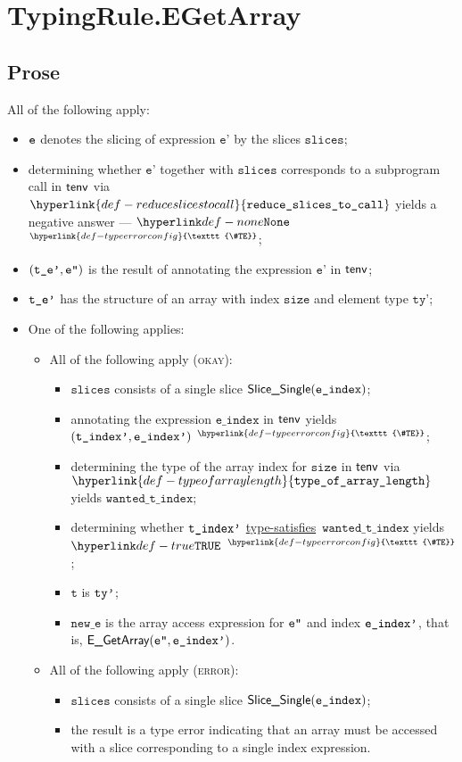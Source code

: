 \documentclass{book}
\newcommand\TypeErrorConfig[0]{\hyperlink{def-typeerrorconfig}{\texttt{\#TE}}}
\newcommand\ProseOrTypeError[0]{\hyperlink{def-proseortypeerror}{$^{\TypeErrorConfig}$}}
\newcommand\typesatisfies[0]{\hyperlink{def-typesatisfies}{type-satisfies}}
\newcommand\reduceslicestocall[0]{\hyperlink{def-reduceslicestocall}{\texttt{reduce\_slices\_to\_call}}}
\newcommand\typeofarraylength[0]{\hyperlink{def-typeofarraylength}{\texttt{type\_of\_array\_length}}}
\newcommand\vt[0]{\texttt{t}}
\newcommand\size[0]{\texttt{size}}
\newcommand\tty[0]{\texttt{ty}}
\newcommand\eindex[0]{\texttt{e\_index}}
\newcommand\wantedtindex[0]{\texttt{wanted\_t\_index}}
\newcommand\slices[0]{\texttt{slices}}
\newcommand\newe[0]{\texttt{new\_e}}
\newcommand\vep[0]{\texttt{e'}}
\begin{document}
\section{TypingRule.EGetArray \label{sec:TypingRule.EGetArray}}

\subsection{Prose}
All of the following apply:
\begin{itemize}
  \item $\texttt{e}$ denotes the slicing of expression $\vep$ by the slices $\slices$;
  \item determining whether $\vep$ together with $\slices$ corresponds to a subprogram call
  in $\textsf{tenv}$ via $\reduceslicestocall$ yields a negative answer --- $\None$ \ProseOrTypeError;
  \item $(\texttt{t\_e'},\texttt{e''})$ is the result of annotating the expression $\vep$ in $\textsf{tenv}$;
  \item $\texttt{t\_e'}$ has the structure of an array with index $\size$ and element type $\tty$';
  \item One of the following applies:
  \begin{itemize}
    \item All of the following apply (\textsc{okay}):
    \begin{itemize}
      \item $\slices$ consists of a single slice $\SliceSingle(\eindex)$;
      \item annotating the expression $\eindex$ in $\textsf{tenv}$ yields $(\texttt{t\_index'}, \texttt{e\_index'})$ \ProseOrTypeError;
      \item determining the type of the array index for $\size$ in $\textsf{tenv}$ via \\ $\typeofarraylength$
      yields $\wantedtindex$;
      \item determining whether $\texttt{t\_index'}$ \typesatisfies\ $\wantedtindex$ yields $\True$ \ProseOrTypeError;
      \item $\vt$ is $\texttt{ty'}$;
      \item $\newe$ is the array access expression for $\texttt{e''}$ and index $\texttt{e\_index'}$, that is, $\textsf{E\_GetArray}(\texttt{e''}, \texttt{e\_index'})$.
    \end{itemize}

    \item All of the following apply (\textsc{error}):
    \begin{itemize}
      \item $\slices$ consists of a single slice $\SliceSingle(\eindex)$;
      \item the result is a type error indicating that an array must be accessed with a slice corresponding to a single index
      expression.
    \end{itemize}
  \end{itemize}
\end{itemize}
\end{document}
